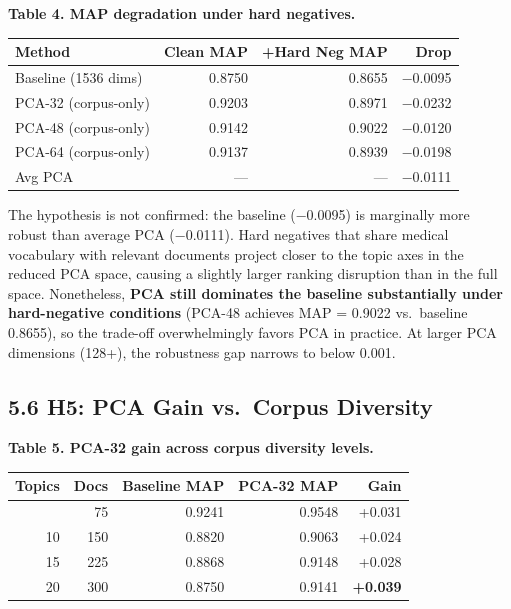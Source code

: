 \documentclass[
  11pt,
  letterpaper,
]{article}
\begin{document}
\textbf{Table 4. MAP degradation under hard negatives.}

{\def\LTcaptype{} %
\begin{longtable}[]{@{}lrrr@{}}
\toprule\noalign{}
Method & Clean MAP & +Hard Neg MAP & Drop \\
\midrule\noalign{}
\endhead
\bottomrule\noalign{}
\endlastfoot
Baseline (1536 dims) & 0.8750 & 0.8655 & −0.0095 \\
PCA-32 (corpus-only) & 0.9203 & 0.8971 & −0.0232 \\
PCA-48 (corpus-only) & 0.9142 & 0.9022 & −0.0120 \\
PCA-64 (corpus-only) & 0.9137 & 0.8939 & −0.0198 \\
Avg PCA & --- & --- & −0.0111 \\
\end{longtable}
}

The hypothesis is not confirmed: the baseline (−0.0095) is marginally
more robust than average PCA (−0.0111). Hard negatives that share
medical vocabulary with relevant documents project closer to the topic
axes in the reduced PCA space, causing a slightly larger ranking
disruption than in the full space. Nonetheless, \textbf{PCA still
dominates the baseline substantially under hard-negative conditions}
(PCA-48 achieves MAP = 0.9022 vs.~baseline 0.8655), so the trade-off
overwhelmingly favors PCA in practice. At larger PCA dimensions (128+),
the robustness gap narrows to below 0.001.

\subsection{5.6 H5: PCA Gain vs.~Corpus
Diversity}\label{h5-pca-gain-vs.-corpus-diversity}

\textbf{Table 5. PCA-32 gain across corpus diversity levels.}

{\def\LTcaptype{} %
\begin{longtable}[]{@{}rrrrr@{}}
\toprule\noalign{}
Topics & Docs & Baseline MAP & PCA-32 MAP & Gain \\
\midrule\noalign{}
\endhead
\bottomrule\noalign{}
\endlastfoot
5 & 75 & 0.9241 & 0.9548 & +0.031 \\
10 & 150 & 0.8820 & 0.9063 & +0.024 \\
15 & 225 & 0.8868 & 0.9148 & +0.028 \\
20 & 300 & 0.8750 & 0.9141 & \textbf{+0.039} \\
\end{longtable}
}
\end{document}
